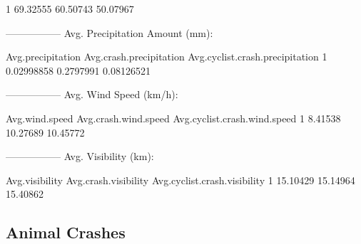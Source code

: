 \documentclass[11pt, a4paper]{article}
\begin{document}
\begin{Schunk}
\begin{Soutput}
1     69.32555           60.50743                   50.07967
\end{Soutput}
\begin{Soutput}
-----------------
Avg. Precipitation Amount (mm):
\end{Soutput}
\begin{Soutput}
  Avg.precipitation Avg.crash.precipitation Avg.cyclist.crash.precipitation
1        0.02998858               0.2797991                      0.08126521
\end{Soutput}
\begin{Soutput}
-----------------
Avg. Wind Speed (km/h):
\end{Soutput}
\begin{Soutput}
  Avg.wind.speed Avg.crash.wind.speed Avg.cyclist.crash.wind.speed
1        8.41538             10.27689                     10.45772
\end{Soutput}
\begin{Soutput}
-----------------
Avg. Visibility (km):
\end{Soutput}
\begin{Soutput}
  Avg.visibility Avg.crash.visibility Avg.cyclist.crash.visibility
1       15.10429             15.14964                     15.40862
\end{Soutput}
\end{Schunk}






\pagebreak
\subsection{Animal Crashes}
\end{document}
